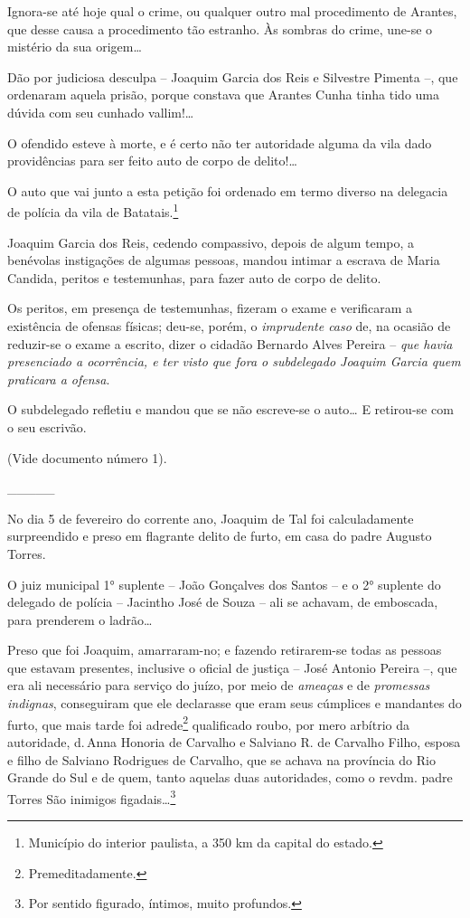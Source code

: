 Ignora-se até hoje qual o crime, ou qualquer outro mal procedimento de
Arantes, que desse causa a procedimento tão estranho. Às sombras do
crime, une-se o mistério da sua origem\ldots{}

Dão por judiciosa desculpa -- Joaquim Garcia dos Reis e Silvestre
Pimenta --, que ordenaram aquela prisão, porque constava que Arantes
Cunha tinha tido uma dúvida com seu cunhado vallim!\ldots{}

O ofendido esteve à morte, e é certo não ter autoridade alguma da vila
dado providências para ser feito auto de corpo de delito!\ldots{}

O auto que vai junto a esta petição foi ordenado em termo diverso na
delegacia de polícia da vila de Batatais.\footnote{ Município do
  interior paulista, a 350 km da capital do estado.}

Joaquim Garcia dos Reis, cedendo compassivo, depois de algum tempo, a
benévolas instigações de algumas pessoas, mandou intimar a escrava de
Maria Candida, peritos e testemunhas, para fazer auto de corpo de
delito.

Os peritos, em presença de testemunhas, fizeram o exame e verificaram a
existência de ofensas físicas; deu-se, porém, o \emph{imprudente caso}
de, na ocasião de reduzir-se o exame a escrito, dizer o cidadão Bernardo
Alves Pereira -- \emph{que havia presenciado a ocorrência, e ter visto
que fora o subdelegado Joaquim Garcia quem praticara a ofensa}.

O subdelegado refletiu e mandou que se não escreve-se o auto\ldots{} E
retirou-se com o seu escrivão.

(Vide documento número 1).

\_\_\_\_\_

No dia 5 de fevereiro do corrente ano, Joaquim de Tal foi calculadamente
surpreendido e preso em flagrante delito de furto, em casa do padre
Augusto Torres.

O juiz municipal 1° suplente -- João Gonçalves dos Santos -- e o 2°
suplente do delegado de polícia -- Jacintho José de Souza -- ali se
achavam, de emboscada, para prenderem o ladrão\ldots{}

Preso que foi Joaquim, amarraram-no; e fazendo retirarem-se todas as
pessoas que estavam presentes, inclusive o oficial de justiça -- José
Antonio Pereira --, que era ali necessário para serviço do juízo, por
meio de \emph{ameaças} e de \emph{promessas indignas}, conseguiram que
ele declarasse que eram seus cúmplices e mandantes do furto, que mais
tarde foi adrede\footnote{ Premeditadamente.} qualificado roubo, por
mero arbítrio da autoridade, d.\,Anna Honoria de Carvalho e Salviano R.
de Carvalho Filho, esposa e filho de Salviano Rodrigues de Carvalho, que
se achava na província do Rio Grande do Sul e de quem, tanto aquelas
duas autoridades, como o revdm. padre Torres São inimigos
figadais\ldots{}\footnote{ Por sentido figurado, íntimos, muito profundos.}

